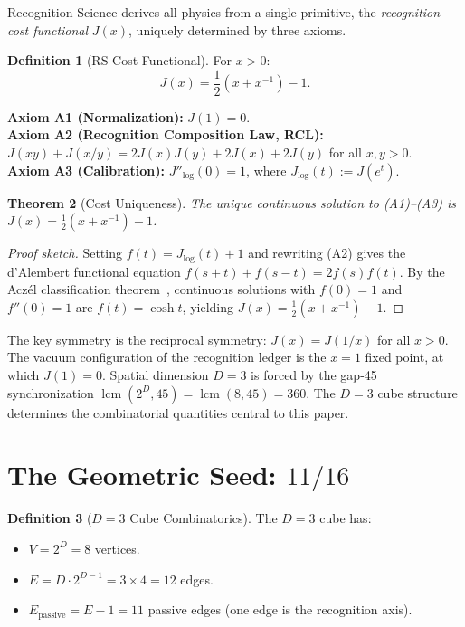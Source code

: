\documentclass[12pt,a4paper]{article}
\newtheorem{theorem}{Theorem}[section]
\theoremstyle{definition}
\newtheorem{definition}[theorem]{Definition}
\theoremstyle{remark}
\begin{document}
Recognition Science derives all physics from a single primitive,
the \emph{recognition cost functional} $J(x)$, uniquely determined
by three axioms.

\begin{definition}[RS Cost Functional]
For $x > 0$:
\begin{equation}
  J(x) = \frac{1}{2}\!\left(x + x^{-1}\right) - 1.
\end{equation}
\end{definition}

\noindent\textbf{Axiom A1 (Normalization):} $J(1) = 0$.\\
\textbf{Axiom A2 (Recognition Composition Law, RCL):}
$J(xy) + J(x/y) = 2J(x)J(y) + 2J(x) + 2J(y)$ for all $x, y > 0$.\\
\textbf{Axiom A3 (Calibration):} $J''_{\log}(0) = 1$, where
$J_{\log}(t) := J(e^t)$.

\begin{theorem}[Cost Uniqueness]
\label{thm:unique}
The unique continuous solution to \textup{(A1)--(A3)} is
$J(x) = \tfrac{1}{2}(x + x^{-1}) - 1$.
\end{theorem}

\begin{proof}[Proof sketch]
Setting $f(t) = J_{\log}(t) + 1$ and rewriting \textup{(A2)} gives
the d'Alembert functional equation $f(s+t) + f(s-t) = 2f(s)f(t)$.
By the Acz\'el classification theorem~\cite{Aczel1966}, continuous
solutions with $f(0) = 1$ and $f''(0) = 1$ are $f(t) = \cosh t$,
yielding $J(x) = \tfrac{1}{2}(x + x^{-1}) - 1$.
\end{proof}

\noindent The key symmetry is the reciprocal symmetry:
$J(x) = J(1/x)$ for all $x > 0$.  The vacuum configuration of
the recognition ledger is the $x = 1$ fixed point, at which
$J(1) = 0$.  Spatial dimension $D = 3$ is forced by the gap-45
synchronization $\operatorname{lcm}(2^D, 45) = \operatorname{lcm}(8, 45) = 360$.
The $D = 3$ cube structure determines the combinatorial quantities
central to this paper.

\section{The Geometric Seed: $11/16$}
\label{sec:seed}

\begin{definition}[$D = 3$ Cube Combinatorics]
\label{def:cube}
The $D = 3$ cube has:
\begin{itemize}[nosep]
  \item $V = 2^D = 8$ vertices.
  \item $E = D \cdot 2^{D-1} = 3 \times 4 = 12$ edges.
  \item $E_{\mathrm{passive}} = E - 1 = 11$ passive edges (one
  edge is the recognition axis).
\end{itemize}
\end{definition}
\end{document}
